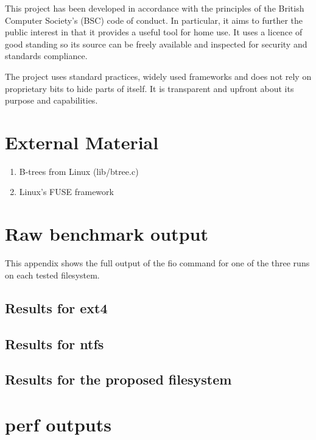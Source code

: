 \begin{appendices}
            This project has been developed in accordance with the principles
            of the British Computer Society's (BSC) code of conduct. In
            particular, it aims to further the public interest in that it
            provides a useful tool for home use. It uses a licence of good
            standing so its source can be freely available and inspected for
            security and standards compliance.

            The project uses standard practices, widely used frameworks and
            does not rely on proprietary bits to hide parts of itself. It is
            transparent and upfront about its purpose and capabilities.

\chapter{External Material}

    \begin{enumerate}
        \item B-trees from Linux (lib/btree.c)
        \item Linux's FUSE framework
    \end{enumerate}

\chapter{Raw benchmark output}
    \label{app:benchmark}

    This appendix shows the full output of the fio command for one of the three
    runs on each tested filesystem.

    \section{Results for ext4}
        
    \section{Results for ntfs}
        
    \section{Results for the proposed filesystem}
        

\chapter{perf outputs}
    \label{app:perf}


\end{appendices}
